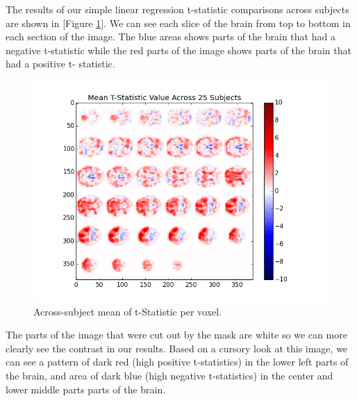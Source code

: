 \par \indent The results of our simple linear regression t-statistic 
comparisons across subjects are shown in [Figure \ref{fig:ht}]. We can see 
each slice of the brain from top to bottom in each section of the image. The 
blue areas shows parts of the brain that had a negative t-statistic while the 
red parts of the image shows parts of the brain that had a positive t-
statistic.

\begin{figure}[ht] \centering
\includegraphics[scale=0.5]{../images/hypothesis_testing} 
\caption{Across-subject mean of t-Statistic per voxel.} 
\label{fig:ht} 
\end{figure}

\par The parts of the image that were cut out by the mask are white so we can 
more clearly see the contrast in our results. Based on a cursory look at this 
image, we can see a pattern of dark red (high positive t-statistics) in the lower 
left parts of the brain, and area of dark blue (high negative t-statistics) in 
the center and lower middle parts parts of the brain.

